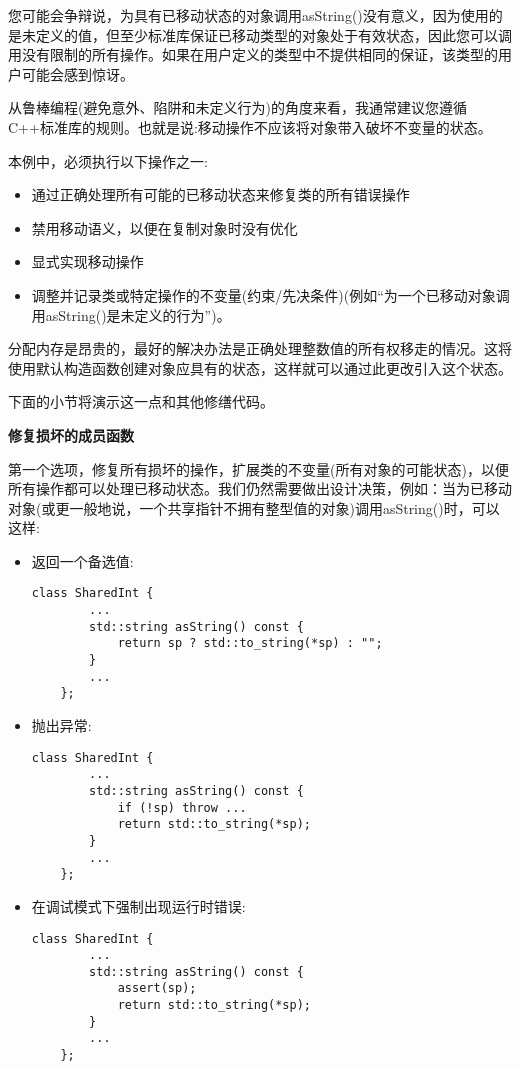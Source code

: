 您可能会争辩说，为具有已移动状态的对象调用asString()没有意义，因为使用的是未定义的值，但至少标准库保证已移动类型的对象处于有效状态，因此您可以调用没有限制的所有操作。如果在用户定义的类型中不提供相同的保证，该类型的用户可能会感到惊讶。\par

从鲁棒编程(避免意外、陷阱和未定义行为)的角度来看，我通常建议您遵循C++标准库的规则。也就是说:移动操作不应该将对象带入破坏不变量的状态。\par

本例中，必须执行以下操作之一:\par

\begin{itemize}
	\item 通过正确处理所有可能的已移动状态来修复类的所有错误操作
	\item 禁用移动语义，以便在复制对象时没有优化
	\item 显式实现移动操作
	\item 调整并记录类或特定操作的不变量(约束/先决条件)(例如“为一个已移动对象调用asString()是未定义的行为”)。
\end{itemize}

分配内存是昂贵的，最好的解决办法是正确处理整数值的所有权移走的情况。这将使用默认构造函数创建对象应具有的状态，这样就可以通过此更改引入这个状态。\par

下面的小节将演示这一点和其他修缮代码。\par

\hspace*{\fill} \par %
\textbf{修复损坏的成员函数}

第一个选项，修复所有损坏的操作，扩展类的不变量(所有对象的可能状态)，以便所有操作都可以处理已移动状态。我们仍然需要做出设计决策，例如：当为已移动对象(或更一般地说，一个共享指针不拥有整型值的对象)调用asString()时，可以这样:\par

\begin{itemize}
	\item 返回一个备选值:\par
	\begin{lstlisting}[caption={}]
	class SharedInt {
		...
		std::string asString() const {
			return sp ? std::to_string(*sp) : "";
		}
		...
	};
	\end{lstlisting}
	\item 抛出异常:\par
	\begin{lstlisting}[caption={}]
	class SharedInt {
		...
		std::string asString() const {
			if (!sp) throw ...
			return std::to_string(*sp);
		}
		...
	};
	\end{lstlisting}
	\item 在调试模式下强制出现运行时错误:\par
	\begin{lstlisting}[caption={}]
	class SharedInt {
		...
		std::string asString() const {
			assert(sp);
			return std::to_string(*sp);
		}
		...
	};
	\end{lstlisting}
\end{itemize}

